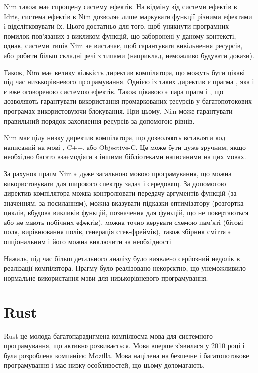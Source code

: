 \documentclass[main.tex]{subfiles}
\begin{document}
Nim також має спрощену систему ефектів. На відміну від системи ефектів в Idris, система ефектів в Nim дозволяє лише маркувати функції різними ефектами i відслітковувати їх. Цього достатньо для того, щоб уникнути програмних помилок пов'язаних з викликом функцій, що заборонені у даному контексті, однак, системи типів Nim не вистачає, щоб гарантувати вивільнення ресурсів, або робити більш складні речі з типами (наприклад, неможливо будувати докази).

Також, Nim має велику кількість директив компілятора\cite{nim:directives}, що можуть бути цікаві під час низькорівневого програмування. Однією із таких директив є прагма , яка і є вже оговореною системою ефектів. Також цікавою є пара прагм  і , що дозволяють гарантувати використання промаркованих ресурсів у багатопотокових програмах використовуючи блокування. При цьому, Nim може гарантувати правильний порядок захоплення ресурсів за допомогою рівнів.

Nim має цілу низку директив компілятора, що дозволяють вставляти код написаний на мові \LangC{}, C++, або Objective-C. Це може бути дуже зручним, якщо необхідно багато взаємодіяти з іншими бібліотеками написаними на цих мовах.

За рахунок прагм Nim є дуже загальною мовою програмування, що можна використовувати для широкого спектру задач і середовищ. За допомогою директив компілятора можна контролювати передачу аргументів функцій (за значенням, за посиланням), можна вказувати підказки оптимізатору (розгортка циклів, вбудова викликів функцій, позначення для функцій, що не повертаються або не мають побічних ефектів), можна точно керувати схемою пам'яті (бітові поля, вирівнювання полів, генерація стек-фреймів), також збірник сміття є опціональним і його можна виключити за необхідності.

Нажаль, під час більш детального аналізу було виявлено серйозний недолік в реалізації компілятора. Прагму  було реалізовано некоректно\cite{nim:volatile}, що унеможливило нормальне використання мови для низькорівневого програмування.

\section{Rust}

Rust\cite{rust} це молода багатопарадигмена компілюєма мова для системного програмування, що активно розвивається. Мова вперше з'явилася у 2010 році і була розроблена компанією Mozilla\cite{rust:mozilla}. Мова націлена на безпечне і багатопотокове програмування і має низку особливостей, що цьому допомагають.
\end{document}
